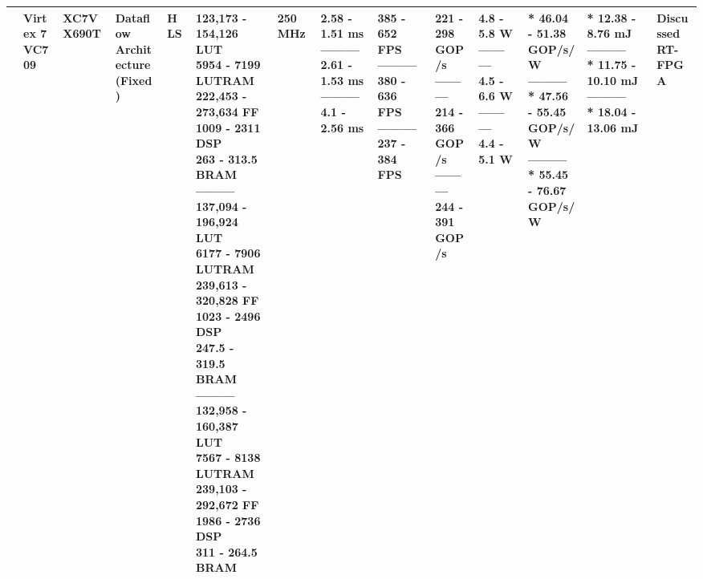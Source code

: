 \begin{center}
{\begin{tabular}{llllllllllllll}
\cite{yangAlgorithmHardwareCodesign2022} & \makecell[tl]{Virtex 7\\ VC709} & XC7VX690T & \makecell[tl]{Dataflow\\ Architecture\\ (Fixed)} & HLS & \makecell[tl]{123,173 - 154,126 LUT\\ 5954 - 7199 LUTRAM\\ 222,453 - 273,634 FF\\ 1009 - 2311 DSP\\ 263 - 313.5 BRAM\\ ---------\\ 137,094 - 196,924 LUT\\ 6177 - 7906 LUTRAM\\ 239,613 - 320,828 FF\\ 1023 - 2496 DSP\\ 247.5 - 319.5 BRAM\\ ---------\\ 132,958 - 160,387 LUT\\ 7567 - 8138 LUTRAM\\ 239,103 - 292,672 FF\\ 1986 - 2736 DSP\\ 311 - 264.5 BRAM} & 250 MHz & \makecell[tl]{2.58 - 1.51 ms\\ ---------\\ 2.61 - 1.53 ms\\ ---------\\ 4.1 - 2.56 ms} & \makecell[tl]{385 - 652 FPS\\ ---------\\ 380 - 636 FPS\\ ---------\\ 237 - 384 FPS} & \makecell[tl]{221 - 298\\ GOP/s\\ ---------\\ 214 - 366\\ GOP/s\\ ---------\\ 244 - 391\\ GOP/s} & \makecell[tl]{4.8 - 5.8 W\\ ---------\\ 4.5 - 6.6 W\\ ---------\\ 4.4 - 5.1 W} & \makecell[tl]{* 46.04 - 51.38\\ GOP/s/W\\ ---------\\ * 47.56 - 55.45\\ GOP/s/W\\ ---------\\ * 55.45 - 76.67\\ GOP/s/W} & \makecell[tl]{* 12.38 - 8.76 mJ\\ ---------\\ * 11.75 - 10.10 mJ\\ ---------\\ * 18.04 - 13.06 mJ} & \makecell[tl]{Discussed\\ RT-FPGA} \\ \hline

\end{tabular}}
\end{center}
